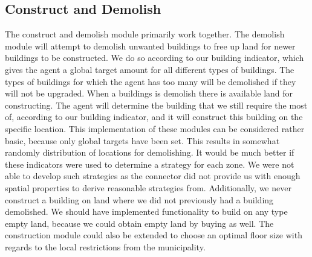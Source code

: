 \subsection{Construct and Demolish}
The construct and demolish module primarily work together. The demolish module will attempt to demolish unwanted buildings to free up land for newer buildings to be constructed. We do so according to our building indicator, which gives the agent a global target amount for all different types of buildings. The types of buildings for which the agent has too many will be demolished if they will not be upgraded. When a buildings is demolish there is available land for constructing. The agent will determine the building that we still require the most of, according to our building indicator, and it will construct this building on the specific location. 
This implementation of these modules can be considered rather basic, because only global targets have been set. This results in somewhat randomly distribution of locations for demolishing. It would be much better if these indicators were used to determine a strategy for each zone. We were not able to develop such strategies as the connector did not provide us with enough spatial properties to derive reasonable strategies from. Additionally, we never construct a building on land where we did not previously had a building demolished. We should have implemented functionality to build on any type empty land, because we could obtain empty land by buying as well. The construction module could also be extended to choose an optimal floor size with regards to the local restrictions from the municipality. 

